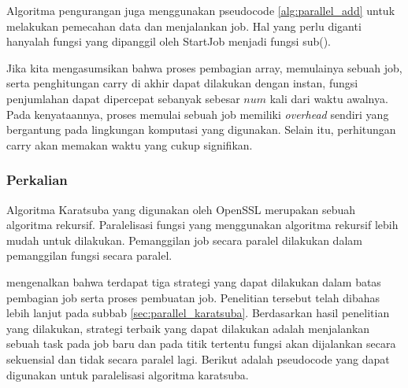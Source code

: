 Algoritma pengurangan juga menggunakan pseudocode \ref{alg:parallel_add} untuk melakukan pemecahan data dan menjalankan job. Hal yang perlu diganti hanyalah fungsi yang dipanggil oleh StartJob menjadi fungsi sub().

Jika kita mengasumsikan bahwa proses pembagian array, memulainya sebuah job, serta penghitungan carry di akhir dapat dilakukan dengan instan, fungsi penjumlahan dapat dipercepat sebanyak sebesar $num$ kali dari waktu awalnya. Pada kenyataannya, proses memulai sebuah job memiliki \textit{overhead} sendiri yang bergantung pada lingkungan komputasi yang digunakan. Selain itu, perhitungan carry akan memakan waktu yang cukup signifikan.


\subsubsection{Perkalian} \label{sec:mul_parallel}

Algoritma Karatsuba yang digunakan oleh OpenSSL merupakan sebuah algoritma rekursif. Paralelisasi fungsi yang menggunakan algoritma rekursif lebih mudah untuk dilakukan. Pemanggilan job secara paralel dilakukan dalam pemanggilan fungsi secara paralel.

\citet{parallel_karatsuba_analysis} mengenalkan bahwa terdapat tiga strategi yang dapat dilakukan dalam batas pembagian job serta proses pembuatan job. Penelitian tersebut telah dibahas lebih lanjut  pada subbab \ref{sec:parallel_karatsuba}. Berdasarkan hasil penelitian yang dilakukan, strategi terbaik yang dapat dilakukan adalah menjalankan sebuah task pada job baru dan pada titik tertentu fungsi akan dijalankan secara sekuensial dan tidak secara paralel lagi. Berikut adalah pseudocode yang dapat digunakan untuk paralelisasi algoritma karatsuba.

